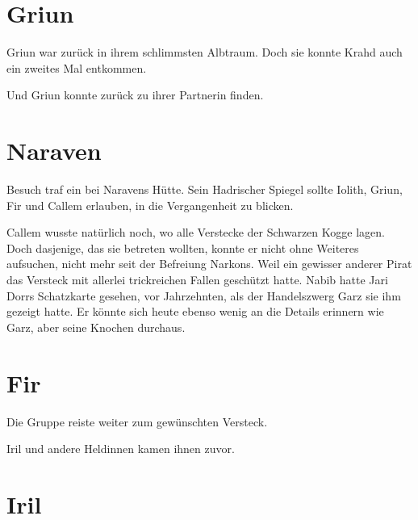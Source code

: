 \newpage
\section{Griun}


Griun war zurück in ihrem schlimmsten Albtraum. Doch sie konnte Krahd auch ein zweites Mal entkommen. 



Und Griun konnte zurück zu ihrer Partnerin finden.









\newpage
\section{Naraven}


Besuch traf ein bei Naravens Hütte. Sein Hadrischer Spiegel sollte Iolith, Griun, Fir und Callem erlauben, in die Vergangenheit zu blicken. 

Callem wusste natürlich noch, wo alle Verstecke der Schwarzen Kogge lagen. Doch dasjenige, das sie betreten wollten, konnte er nicht ohne Weiteres aufsuchen, nicht mehr seit der Befreiung Narkons. Weil ein gewisser anderer Pirat das Versteck mit allerlei trickreichen Fallen geschützt hatte.
Nabib hatte Jari Dorrs Schatzkarte gesehen, vor Jahrzehnten, als der Handelszwerg Garz sie ihm gezeigt hatte. Er könnte sich heute ebenso wenig an die Details erinnern wie Garz, aber seine Knochen durchaus.














\newpage
\section{Fir}

Die Gruppe reiste weiter zum gewünschten Versteck.

Iril und andere Heldinnen kamen ihnen zuvor.





\newpage
\section{Iril}


